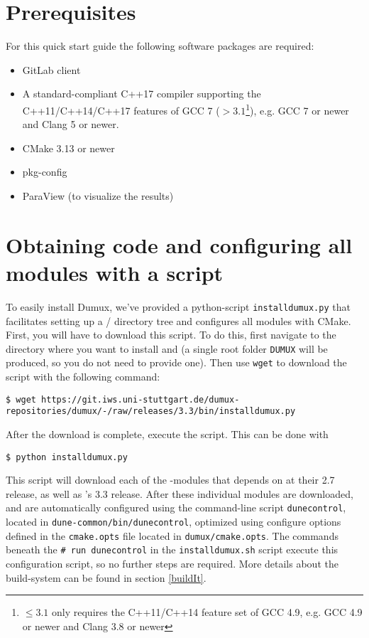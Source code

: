 \section{Prerequisites} \label{sec:prerequisites}
For this quick start guide the following software packages are required:
\begin{itemize}
\item GitLab client
\item A standard-compliant C++17 compiler supporting the C++11/C++14/C++17 features of GCC 7
(\Dumux $> 3.1$\footnote{\Dumux $\leq 3.1$ only requires the C++11/C++14 feature set of GCC 4.9,
e.g. GCC 4.9 or newer and Clang 3.8 or newer}), e.g. GCC 7 or newer and Clang 5 or newer.
\item CMake 3.13 or newer
\item pkg-config
\item ParaView (to visualize the results)
\end{itemize}

\section{Obtaining code and configuring all modules with a script}
To easily install Dumux, we've provided a python-script \texttt{installdumux.py} that facilitates
setting up a {\Dune}/{\Dumux} directory tree and configures all modules with CMake.
First, you will have to download this script. To do this, first navigate to the directory where you
want to install \Dumux and \Dune (a single root folder \texttt{DUMUX} will be produced, so you do
not need to provide one). Then use \texttt{wget} to download the script with the following command:
\begin{lstlisting}[style=Bash]
$ wget https://git.iws.uni-stuttgart.de/dumux-repositories/dumux/-/raw/releases/3.3/bin/installdumux.py
\end{lstlisting}

After the download is complete, execute the script. This can be done with
\begin{lstlisting}[style=Bash]
$ python installdumux.py
\end{lstlisting}

This script will download each of the \Dune-modules that \Dumux depends on at their 2.7 release,
as well as \Dumux's 3.3 release. After these individual modules are downloaded, \Dune and \Dumux
are automatically configured using the command-line script \texttt{dunecontrol}, located in
\texttt{dune-common/bin/dunecontrol}, optimized using configure options defined in the \texttt{cmake.opts}
file located in \texttt{dumux/cmake.opts}. The commands beneath the \texttt{\# run dunecontrol} in
the \texttt{installdumux.sh} script execute this configuration script, so no further steps are required.
More details about the build-system can be found in section \ref{buildIt}.

